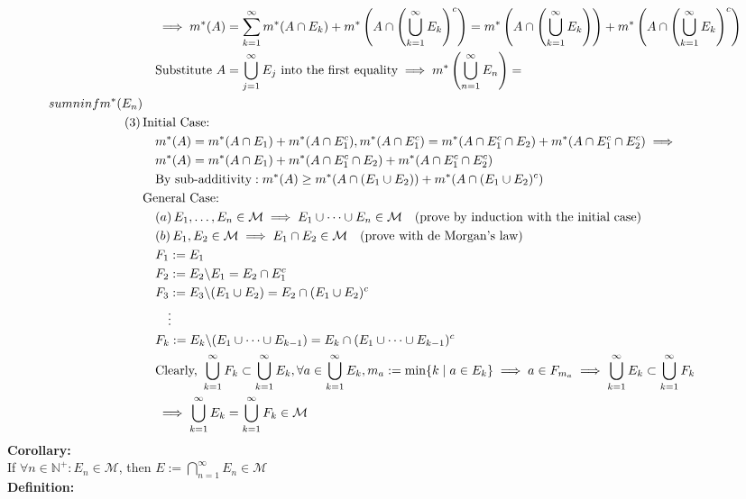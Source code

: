 \documentclass{article}
\newcommand{\N}{\mathbb{N}}
\newcommand{\sumninf}{\sum\limits_{n=1}^\infty}
\newcommand{\capninf}{\bigcap\limits_{n=1}^\infty}
\newcommand{\infcup}{\bigcup\limits_{n=1}^\infty}
\newcommand{\0}{{\bf{0}}}
\newcommand{\1}{{\bf{1}}}
\begin{document}
\begin{equation}
\begin{split}
    &\quad\implies m^*(A)=\sum_{k=1}^\infty m^*(A\cap E_k)+m^*\left(A\cap\left(\bigcup_{k=1}^\infty E_k\right)^c\right)=m^*\left(A\cap\left(\bigcup_{k=1}^\infty E_k\right)\right)+m^*\left(A\cap\left(\bigcup_{k=1}^\infty E_k\right)^c\right)\\
    &\quad\mbox{Substitute }A=\bigcup_{j=1}^\infty E_j\mbox{ into the first equality}\implies m^*\left(\infcup E_n\right)=\\sumninf m^*(E_n)\\
    (3)\,&\mbox{Initial Case:}\\
    &\quad m^*(A)=m^*(A\cap E_1)+m^*(A\cap E_1^c),m^*(A\cap E_1^c)=m^*(A\cap E_1^c\cap E_2)+m^*(A\cap E_1^c\cap E_2^c)\implies\\
    &\quad m^*(A)=m^*(A\cap E_1)+m^*(A\cap E_1^c\cap E_2)+m^*(A\cap E_1^c\cap E_2^c)\\
    &\quad\mbox{By sub-additivity}:m^*(A)\geq m^*(A\cap(E_1\cup E_2))+m^*(A\cap(E_1\cup E_2)^c)\\
    &\mbox{General Case:}\\
    &\quad(a)\,E_1,\dots,E_n\in\mathcal{M}\implies E_1\cup\dots\cup E_n\in\mathcal{M}\quad\mbox{(prove by induction with the initial case)}\\
    &\quad(b)\,E_1,E_2\in\mathcal{M}\implies E_1\cap E_2\in\mathcal{M}\quad\mbox{(prove with de Morgan's law)}\\
    &\quad F_1:=E_1\\
    &\quad F_2:=E_2\symbol{92}E_1=E_2\cap E_1^c\\
    &\quad F_3:=E_3\symbol{92}(E_1\cup E_2)=E_2\cap(E_1\cup E_2)^c\\
    &\quad\quad\vdots\\
    &\quad F_k:=E_k\symbol{92}(E_1\cup\dots\cup E_{k-1})=E_k\cap(E_1\cup\dots\cup E_{k-1})^c\\
    &\quad\mbox{Clearly, }\bigcup_{k=1}^\infty F_k\subset\bigcup_{k=1}^\infty E_k,\forall a\in\bigcup_{k=1}^\infty E_k,m_a:=\min\{k\mid a\in E_k\}\implies a\in F_{m_a}\implies \bigcup_{k=1}^\infty E_k\subset\bigcup_{k=1}^\infty F_k\\
    &\quad\implies \bigcup_{k=1}^\infty E_k=\bigcup_{k=1}^\infty F_k\in\mathcal{M}\\
\end{split}
\end{equation}
\textbf{Corollary:}\\
If $\forall n\in\N^+:E_n\in\mathcal{M}$, then $E:=\capninf E_n\in\mathcal{M}$\\
\textbf{Definition:}\\
\end{document}
